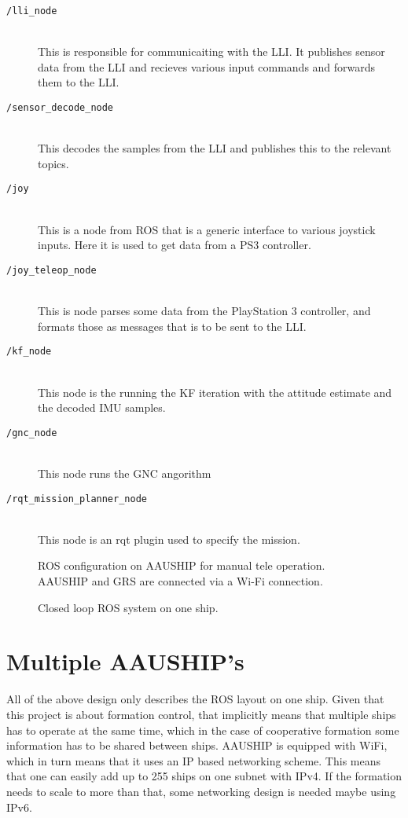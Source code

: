 \begin{description}
	\item[\texttt{/lli\_node}]\hfill \\
		This is responsible for communicaiting with the \ac{LLI}. It
		publishes sensor data from the \ac{LLI} and recieves various input
		commands and forwards them to the \ac{LLI}.
	\item[\texttt{/sensor\_decode\_node}]\hfill \\
		This decodes the samples from the \ac{LLI} and publishes this to
		the relevant topics. 
	\item[\texttt{/joy}]\hfill \\
		This is a node from \ac{ROS} that is a generic interface to
		various joystick inputs. Here it is used to get data from a PS3
		controller.
	\item[\texttt{/joy\_teleop\_node}]\hfill \\
		This is node parses some data from the PlayStation 3 controller, and formats
		those as messages that is to be sent to the \ac{LLI}.
	\item[\texttt{/kf\_node}]\hfill \\
		This node is the running the \ac{KF} iteration with the attitude estimate and
		the decoded \ac{IMU} samples.
	\item[\texttt{/gnc\_node}]\hfill \\
		This node runs the \ac{GNC} angorithm
	\item[\texttt{/rqt\_mission\_planner\_node}]\hfill \\
		This node is an rqt plugin used to specify the mission.
\end{description}

\begin{figure}[htbp]
	\centering
	
	\caption{ROS configuration on AAUSHIP for manual tele operation.
	AAUSHIP and GRS are connected via a Wi-Fi connection.}
	\label{fig:ros-aauship-teleop}
\end{figure}

\begin{figure}[htbp]
	\centering
	{\footnotesize
	}
	\caption{Closed loop ROS system on one ship.}
	\label{fig:ros-aauship-closed-loop-single}
\end{figure}


\section{Multiple AAUSHIP's}
All of the above design only describes the ROS layout on one ship.
Given that this project is about formation control, that implicitly
means that multiple ships has to operate at the same time, which in
the case of cooperative formation some information has to be shared
between ships. AAUSHIP is equipped with WiFi, which in turn means that
it uses an \ac{IP} based networking scheme. This means that one can
easily add up to 255 ships on one subnet with \ac{IPv4}. If the
formation needs to scale to more than that, some networking design is
needed maybe using \ac{IPv6}.

